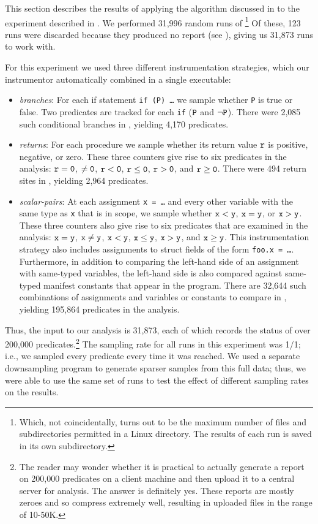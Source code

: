 
This section describes the results of applying the algorithm discussed
in  to the experiment described in
.  We performed 31,996 random runs of
\moss\footnote{Which, not coincidentally, turns out to be the maximum
number of files and subdirectories permitted in a Linux directory.
The results of each run is saved in its own subdirectory.}  Of these,
123 runs were discarded because they produced no report (see ),
giving us 31,873 runs to work with.  

For this experiment we used three different instrumentation strategies, which our
instrumentor automatically combined in a single executable:
\begin{itemize}
\item {\em branches}: For each if statement {\tt if (P) \ldots} we sample whether {\tt P} is true or false.
Two predicates are tracked for each {\tt if} ($\tt P$ and $\tt \neg P$).  There were 2,085 such conditional branches
in \moss, yielding 4,170 predicates.

\item {\em returns}: For each procedure we sample whether its return value $\tt r$ is positive, negative, or zero.
These three counters give rise to six predicates in the analysis: $\tt r = 0$, $\tt \neq 0$, $\tt r < 0$, $\tt r \leq 0$, $\tt r > 0$, and $\tt r \geq 0$.
There were 494 return sites in \moss, yielding 2,964 predicates.

\item {\em scalar-pairs}: At each assignment {\tt x = \ldots} and every other variable with the same type as {\tt x} that is in scope,
we sample whether $\tt x < y$, $\tt x = y$, or $\tt x > y$.  These
three counters also give rise to six predicates that are examined in
the analysis: $\tt x = y$, $\tt x \neq y$, $\tt x < y$, $\tt x \leq
y$, $\tt x > y$, and $\tt x \geq y$.  This instrumentation strategy 
also includes assignments to struct fields of the form {\tt foo.x =
\ldots}.  Furthermore, in addition to comparing the left-hand side of
an assignment with same-typed variables, the left-hand side is also compared against
same-typed manifest constants that appear in the program.  There are
32,644 such combinations of assignments and variables or constants
to compare in \moss, yielding 195,864 predicates in the analysis.
\end{itemize}

Thus, the input to our analysis is 31,873, each of which records the
status of over 200,000 predicates.\footnote{The reader may wonder
whether it is practical to actually generate a report on 200,000
predicates on a client machine and then upload it to a central server
for analysis.  The answer is definitely yes.  These reports are mostly
zeroes and so compress extremely well, resulting in uploaded files in
the range of 10-50K.}  The sampling rate for all runs in this
experiment was 1/1; i.e., we sampled every predicate every time it was
reached.  We used a separate downsampling program to generate sparser
samples from this full data; thus, we were able to use the same set of
runs to test the effect of different sampling rates on the results.

